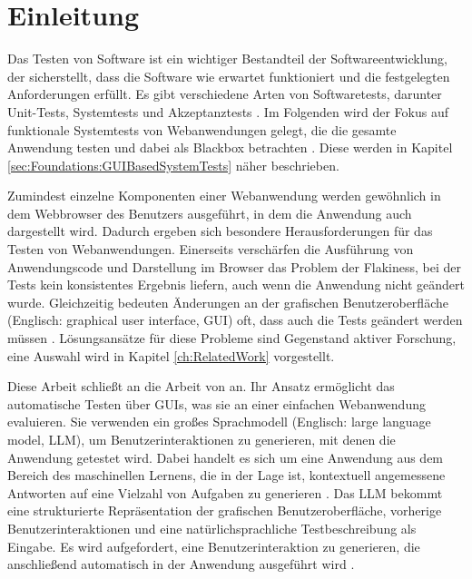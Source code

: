 
\chapter{Einleitung}
\label{ch:Introduction}




Das Testen von Software ist ein wichtiger Bestandteil der Softwareentwicklung, der sicherstellt, dass die Software wie erwartet funktioniert und die festgelegten Anforderungen erfüllt.
Es gibt verschiedene Arten von Softwaretests, darunter Unit-Tests, Systemtests und Akzeptanztests \cite{Sommerville10}.
Im Folgenden wird der Fokus auf funktionale Systemtests von Webanwendungen gelegt, die die gesamte Anwendung testen und dabei als Blackbox betrachten \cite{Beizer1990}.
Diese werden in Kapitel \ref{sec:Foundations:GUIBasedSystemTests} näher beschrieben.


Zumindest einzelne Komponenten einer Webanwendung werden gewöhnlich in dem Webbrowser des Benutzers ausgeführt, in dem die Anwendung auch dargestellt wird.
Dadurch ergeben sich besondere Herausforderungen für das Testen von Webanwendungen.
Einerseits verschärfen die Ausführung von Anwendungscode und Darstellung im Browser das Problem der \glqq{}Flakiness\grqq{}, bei der Tests kein konsistentes Ergebnis liefern, auch wenn die Anwendung nicht geändert wurde.
Gleichzeitig bedeuten Änderungen an der grafischen Benutzeroberfläche (Englisch: \foreignlanguage{english}{graphical user interface}, GUI) oft, dass auch die Tests geändert werden müssen \cite{ChallengesSelenium}.
Lösungsansätze für diese Probleme sind Gegenstand aktiver Forschung, eine Auswahl wird in Kapitel \ref{ch:RelatedWork} vorgestellt.


Diese Arbeit schließt an die Arbeit von  an.
Ihr Ansatz ermöglicht das automatische Testen über GUIs, was sie an einer einfachen Webanwendung evaluieren.
Sie verwenden ein großes Sprachmodell (Englisch: \foreignlanguage{english}{large language model}, LLM), um Benutzerinteraktionen zu generieren, mit denen die Anwendung getestet wird.
Dabei handelt es sich um eine Anwendung aus dem Bereich des maschinellen Lernens, die in der Lage ist, kontextuell angemessene Antworten auf eine Vielzahl von Aufgaben zu generieren \cite{FewShotLearners}.
Das LLM bekommt eine strukturierte Repräsentation der grafischen Benutzeroberfläche, vorherige Benutzerinteraktionen und eine natürlichsprachliche Testbeschreibung als Eingabe.
Es wird aufgefordert, eine Benutzerinteraktion zu generieren, die anschließend automatisch in der Anwendung ausgeführt wird \cite{GPT3Testing}.


